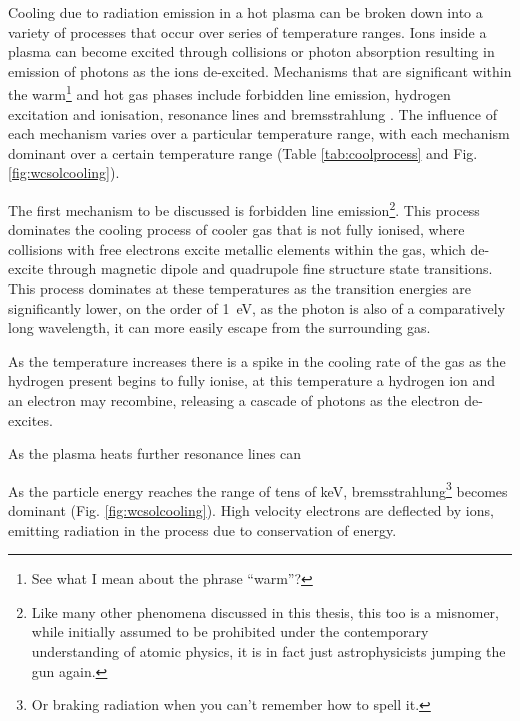 
Cooling due to radiation emission in a hot plasma can be broken down into a variety of processes that occur over series of temperature ranges.
Ions inside a plasma can become excited through collisions or photon absorption resulting in emission of photons as the ions de-excited. 
Mechanisms that are significant within the warm\footnote{See what I mean about the phrase ``warm''?} and hot gas phases include forbidden line emission, hydrogen excitation and ionisation, resonance lines and bremsstrahlung \parencite{dysonPhysicsInterstellarMedium2021}.
The influence of each mechanism varies over a particular temperature range, with each mechanism dominant over a certain temperature range (Table \ref{tab:coolprocess} and Fig. \ref{fig:wcsolcooling}).


The first mechanism to be discussed is forbidden line emission\footnote{Like many other phenomena discussed in this thesis, this too is a misnomer, while initially assumed to be prohibited under the contemporary understanding of atomic physics, it is in fact just astrophysicists jumping the gun again.}.
This process dominates the cooling process of cooler gas that is not fully ionised, where collisions with free electrons excite metallic elements within the gas, which de-excite through magnetic dipole and quadrupole fine structure state transitions.
This process dominates at these temperatures as the transition energies are significantly lower, on the order of \SI{1}{\electronvolt}, as the photon is also of a comparatively long wavelength, it can more easily escape from the surrounding gas.


As the temperature increases there is a spike in the cooling rate of the gas as the hydrogen present begins to fully ionise, at this temperature a hydrogen ion and an electron may recombine, releasing a cascade of photons as the electron de-excites.


As the plasma heats further resonance lines can


As the particle energy reaches the range of tens of \si{\kilo\electronvolt}, bremsstrahlung\footnote{Or braking radiation when you can't remember how to spell it.} becomes dominant (Fig. \ref{fig:wcsolcooling}). High velocity electrons are deflected by ions, emitting radiation in the process due to conservation of energy. 

